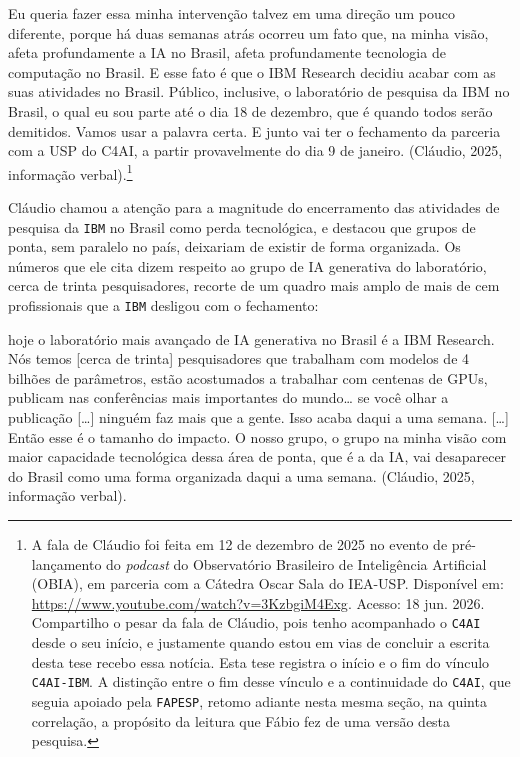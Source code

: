 \begin{citacaoabnt}
Eu queria fazer essa minha intervenção talvez em uma direção um pouco diferente, porque há duas semanas atrás ocorreu um fato que, na minha visão, afeta profundamente a IA no Brasil, afeta profundamente tecnologia de computação no Brasil. E esse fato é que o IBM Research decidiu acabar com as suas atividades no Brasil. Público, inclusive, o laboratório de pesquisa da IBM no Brasil, o qual eu sou parte até o dia 18 de dezembro, que é quando todos serão demitidos. Vamos usar a palavra certa. E junto vai ter o fechamento da parceria com a USP do C4AI, a partir provavelmente do dia 9 de janeiro. (Cláudio, 2025, informação verbal).\footnote{A fala de Cláudio foi feita em 12 de dezembro de 2025 no evento de pré-lançamento do \textit{podcast} do Observatório Brasileiro de Inteligência Artificial (OBIA), em parceria com a Cátedra Oscar Sala do IEA-USP. Disponível em: \url{https://www.youtube.com/watch?v=3KzbgiM4Exg}. Acesso: 18 jun. 2026. Compartilho o pesar da fala de Cláudio, pois tenho acompanhado o \texttt{C4AI} desde o seu início, e justamente quando estou em vias de concluir a escrita desta tese recebo essa notícia. Esta tese registra o início e o fim do vínculo \texttt{C4AI-IBM}. A distinção entre o fim desse vínculo e a continuidade do \texttt{C4AI}, que seguia apoiado pela \texttt{FAPESP}, retomo adiante nesta mesma seção, na quinta correlação, a propósito da leitura que Fábio fez de uma versão desta pesquisa.} %
\end{citacaoabnt}

Cláudio chamou a atenção para a magnitude do encerramento das atividades de pesquisa da \texttt{IBM} no Brasil como perda tecnológica, e destacou que grupos de ponta, sem paralelo no país, deixariam de existir de forma organizada. Os números que ele cita dizem respeito ao grupo de IA generativa do laboratório, cerca de trinta pesquisadores, recorte de um quadro mais amplo de mais de cem profissionais que a \texttt{IBM} desligou com o fechamento:

\begin{citacaoabnt}
[\ldots{}] hoje o laboratório mais avançado de IA generativa no Brasil é a IBM Research. Nós temos [cerca de trinta] pesquisadores que trabalham com modelos de 4 bilhões de parâmetros, estão acostumados a trabalhar com centenas de GPUs, publicam nas conferências mais importantes do mundo\ldots{} se você olhar a publicação [\ldots{}] ninguém faz mais que a gente. Isso acaba daqui a uma semana. [\ldots{}] Então esse é o tamanho do impacto. O nosso grupo, o grupo na minha visão com maior capacidade tecnológica dessa área de ponta, que é a da IA, vai desaparecer do Brasil como uma forma organizada daqui a uma semana. (Cláudio, 2025, informação verbal).
\end{citacaoabnt}

